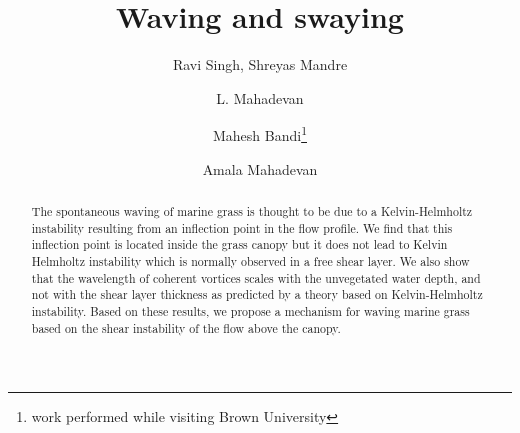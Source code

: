 \documentclass[aps,twocolumn,floatfix,prl,10pt]{revtex4-1}
\begin{document}
\title{Waving and swaying}
\author{Ravi Singh, Shreyas Mandre}
\author{L. Mahadevan}
\author{Mahesh Bandi\footnote{work performed while visiting Brown University}}
\author{Amala Mahadevan}

\begin{abstract}
The spontaneous waving of marine grass is thought to be due to a Kelvin-Helmholtz instability resulting from an inflection point in the flow profile. 
We find that this inflection point is located inside the grass canopy but it does not lead to Kelvin Helmholtz instability which is 
normally observed in a free shear layer. We also show that the wavelength of coherent vortices scales with the unvegetated water depth, and not with 
the shear layer thickness as predicted by a theory based on Kelvin-Helmholtz instability. Based on these results, we propose a mechanism for waving 
marine grass based on the shear instability of the flow above the canopy.

\end{abstract}
\maketitle
\end{document}
